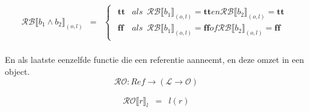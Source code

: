 \documentclass[12pt]{article}
\newcommand{\RB}{\mathcal{RB}}
\newcommand{\RO}{\mathcal{RO}}
\begin{document}
\[\begin{matrix}
\RB \llbracket b_1 \wedge b_2 \rrbracket_{(o,l)} & = &
\begin{cases}
\begin{matrix}
\boldsymbol{tt} & als \enspace \RB\llbracket b_1 \rrbracket_{(o,l)} = \boldsymbol{tt} en \RB \llbracket b_2 \rrbracket_{(o,l)} = \boldsymbol{tt}\\
\boldsymbol{ff} & als \enspace \RB\llbracket b_1 \rrbracket_{(o,l)} = \boldsymbol{ff} of \RB \llbracket b_2 \rrbracket_{(o,l)} = \boldsymbol{ff}
\end{matrix}
\end{cases}\\

\end{matrix}
\]

En als laatste eenzelfde functie die een referentie aanneemt, en deze omzet in een object.
\[ \RO : Ref \rightarrow ( \mathcal{L} \rightarrow \mathcal{O}) \]

\[
\begin{matrix}
\RO \llbracket r \rrbracket_l & = & l(r)
\end{matrix}
\]
\end{document}

